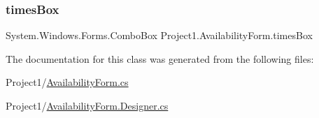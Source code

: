 \mbox{\label{classProject1_1_1AvailabilityForm_ade05a84a3b2f475e58385e13f2a35f38}} 
\subsubsection{\texorpdfstring{times\+Box}{timesBox}}
{\footnotesize\ttfamily System.\+Windows.\+Forms.\+Combo\+Box Project1.\+Availability\+Form.\+times\+Box\hspace{0.3cm}{\ttfamily [private]}}



The documentation for this class was generated from the following files\+:\begin{DoxyCompactItemize}
\item 
Project1/\hyperlink{AvailabilityForm_8cs}{Availability\+Form.\+cs}\item 
Project1/\hyperlink{AvailabilityForm_8Designer_8cs}{Availability\+Form.\+Designer.\+cs}\end{DoxyCompactItemize}
